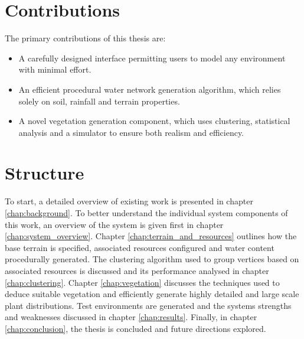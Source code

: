 \section{Contributions}

The primary contributions of this thesis are:
\begin{itemize}
\item A carefully designed interface permitting users to model any environment with minimal effort.
\item An efficient procedural water network generation algorithm, which relies solely on soil, rainfall and terrain properties.
\item A novel vegetation generation component, which uses clustering, statistical analysis and a simulator to ensure both realism and efficiency.
\end{itemize}

\section{Structure}

To start, a detailed overview of existing work is presented in chapter \ref{chap:background}. To better understand the individual system components of this work, an overview of the system is given first in chapter \ref{chap:system_overview}. Chapter \ref{chap:terrain_and_resources} outlines how the base terrain is specified, associated resources configured and water content procedurally generated. The clustering algorithm used to group vertices based on associated resources is discussed and its performance analysed in chapter \ref{chap:clustering}. Chapter \ref{chap:vegetation} discusses the techniques used to deduce suitable vegetation and efficiently generate highly detailed and large scale plant distributions. Test environments are generated and the systems strengths and weaknesses discussed in chapter \ref{chap:results}. Finally, in chapter \ref{chap:conclusion}, the thesis is concluded and future directions explored.
